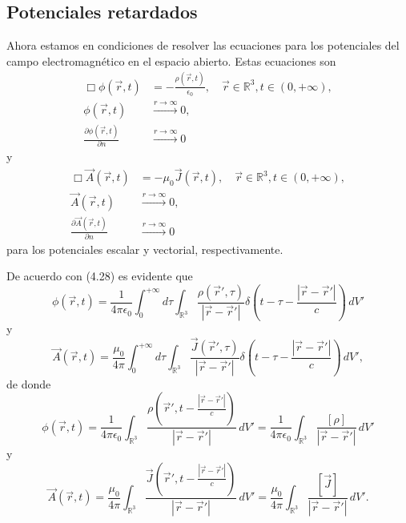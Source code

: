 \documentclass[12pt,a4paper]{book}
\begin{document}
\subsection{Potenciales retardados}

Ahora estamos en condiciones de resolver las ecuaciones para los potenciales del campo electromagnético en el espacio abierto. Estas ecuaciones son
\begin{align}
\Box\phi(\vec{r}, t) &= -\frac{\rho(\vec{r}, t)}{\epsilon_0}, \quad \vec{r} \in \mathbb{R}^3, t \in (0, +\infty), \\
\phi(\vec{r}, t) &\xrightarrow{r\to\infty} 0, \\
\frac{\partial \phi(\vec{r}, t)}{\partial n} &\xrightarrow{r\to\infty} 0
\end{align}
y
\begin{align}
\Box\vec{A}(\vec{r}, t) &= -\mu_0 \vec{J}(\vec{r}, t), \quad \vec{r} \in \mathbb{R}^3, t \in (0, +\infty), \\
\vec{A}(\vec{r}, t) &\xrightarrow{r\to\infty} 0, \\
\frac{\partial \vec{A}(\vec{r}, t)}{\partial n} &\xrightarrow{r\to\infty} 0
\end{align}
para los potenciales escalar y vectorial, respectivamente.

De acuerdo con (4.28) es evidente que
\begin{equation}
\phi(\vec{r}, t) = \frac{1}{4\pi\epsilon_0}\int_0^{+\infty} d\tau \int_{\mathbb{R}^3} \frac{\rho(\vec{r}', \tau)}{|\vec{r} - \vec{r}'|}\delta\left(t - \tau - \frac{|\vec{r} - \vec{r}'|}{c}\right)\,dV'
\end{equation}
y
\begin{equation}
\vec{A}(\vec{r}, t) = \frac{\mu_0}{4\pi}\int_0^{+\infty} d\tau \int_{\mathbb{R}^3} \frac{\vec{J}(\vec{r}', \tau)}{|\vec{r} - \vec{r}'|}\delta\left(t - \tau - \frac{|\vec{r} - \vec{r}'|}{c}\right)\,dV',
\end{equation}
de donde
\begin{equation}
\phi(\vec{r}, t) = \frac{1}{4\pi\epsilon_0}\int_{\mathbb{R}^3} \frac{\rho\left(\vec{r}', t - \frac{|\vec{r} - \vec{r}'|}{c}\right)}{|\vec{r} - \vec{r}'|}\,dV' = \frac{1}{4\pi\epsilon_0}\int_{\mathbb{R}^3} \frac{[\rho]}{|\vec{r} - \vec{r}'|}\,dV'
\end{equation}
y
\begin{equation}
\vec{A}(\vec{r}, t) = \frac{\mu_0}{4\pi}\int_{\mathbb{R}^3} \frac{\vec{J}\left(\vec{r}', t - \frac{|\vec{r} - \vec{r}'|}{c}\right)}{|\vec{r} - \vec{r}'|}\,dV' = \frac{\mu_0}{4\pi}\int_{\mathbb{R}^3} \frac{[\vec{J}]}{|\vec{r} - \vec{r}'|}\,dV'.
\end{equation}
\end{document}
